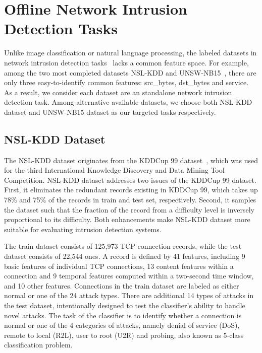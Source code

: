 \section{Offline Network Intrusion Detection Tasks}
Unlike image classification or natural language processing,
the labeled datasets in network intrusion detection tasks~\cite{KDDCup, DARPA, UNSW1, UNSW, NSL-KDD} lacks a common feature space.
For example, among the two most completed datasets NSL-KDD\cite{NSL-KDD} and UNSW-NB15~\cite{UNSW},
there are only three easy-to-identify common features: src\_bytes, dst\_bytes and service.
As a result, we consider each dataset are an standalone network intrusion detection task.
Among alternative available datasets,
we choose both NSL-KDD dataset and UNSW-NB15 dataset as our targeted tasks respectively.

\subsection{NSL-KDD Dataset}
The NSL-KDD dataset originates from the KDDCup 99 dataset~\cite{KDDCup},
which was used for the third International Knowledge Discovery and Data Mining Tool Competition.
NSL-KDD dataset addresses two issues of the KDDCup 99 dataset.
First, it eliminates the redundant records existing in KDDCup 99, which takes up
78\% and 75\% of the records in train and test set, respectively.
Second, it samples the dataset such that the fraction of the record from a difficulty level
is inversely proportional to its difficulty.
Both enhancements make NSL-KDD dataset more suitable for
evaluating intrusion detection systems.

The train dataset consists of 125,973 TCP connection records, while the test dataset
consists of 22,544 ones.
A record is defined by 41 features, including 9 basic features of individual
TCP connections, 13 content features within a connection and 9 temporal features computed
within a two-second time window, and 10 other features.
Connections in the train dataset are labeled as either normal or one of the 24 attack
types.
There are additional 14 types of attacks in the test dataset, intentionally designed to
test the classifier's ability to handle novel attacks.
The task of the classifier is to identify whether a connection is normal or one of the
4 categories of attacks, namely denial of service (DoS), remote to local (R2L), user to
root (U2R) and probing, also known as 5-class classification problem.

